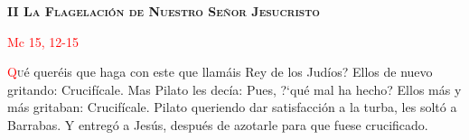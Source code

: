 \begin{center}
    \textbf{\textsc{II La Flagelación de Nuestro Señor Jesucristo}}

    \textcolor{red}{Mc 15, 12-15}
\end{center}

\lettrine[lines=2, ante={?`}]{\textcolor{red}{Q}}ué queréis que haga con este que llamáis Rey de los Judíos? Ellos de nuevo gritando: Crucifícale. Mas Pilato les decía: Pues, {?`}qué
mal ha hecho? Ellos más y más gritaban: Crucifícale. Pilato queriendo dar satisfacción a la turba, les soltó a Barrabas. Y entregó a Jesús, después de azotarle para que fuese crucificado.